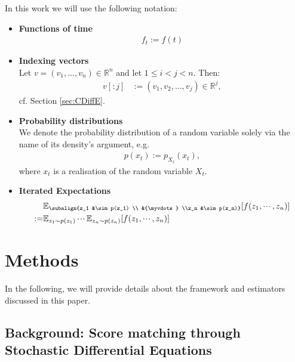 In this work we will use the following notation:
\begin{itemize}
    \item \textbf{Functions of time}
    \begin{gather*}
        f_t := f(t)
    \end{gather*}
    \item \textbf{Indexing vectors} \\
    Let $v = (v_1, ..., v_n) \in \mathbb{R}^n$ and let $ 1 \leq i < j < n$. Then:
    \begin{align*}
        v[:j] &:= (v_1, v_{2}, ..., v_j) \in \mathbb{R}^{j},
    \end{align*}
    cf. Section \ref{sec:CDiffE}.
    \item \textbf{Probability distributions} \\
    We denote the probability distribution of a random variable solely via the name of its density's argument, e.g.
    \begin{gather*}
        p(x_t) := p_{X_t}(x_t),
    \end{gather*}   
    where $x_t$ is a realisation of the random variable $X_t$.
    \item \textbf{Iterated Expectations}
    \begin{align*}
        &\mathbb{E}_{\subalign{z_1 &\sim p(z_1) \\ &{\myvdots} \\z_n &\sim p(z_n)}}[f(z_1,\Compactcdots,z_n)] \\
        :=&\mathbb{E}_{z_1 \sim p(z_1)} \Compactcdots \mathbb{E}_{z_n \sim p(z_n)}[f(z_1,\Compactcdots,z_n)]
    \end{align*}
\end{itemize}

\section{Methods}
In the following, we will provide details about the framework and estimators discussed in this paper.
\subsection{Background: Score matching through Stochastic Differential Equations}
